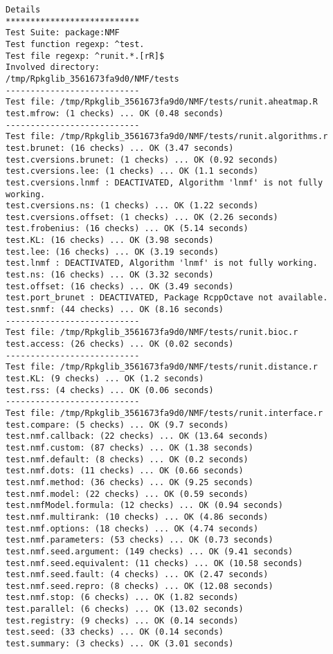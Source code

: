 \documentclass[10pt]{article}\usepackage[]{graphicx}\usepackage[]{color}
\begin{document}
\begin{verbatim}
Details 
*************************** 
Test Suite: package:NMF 
Test function regexp: ^test. 
Test file regexp: ^runit.*.[rR]$ 
Involved directory: 
/tmp/Rpkglib_3561673fa9d0/NMF/tests 
--------------------------- 
Test file: /tmp/Rpkglib_3561673fa9d0/NMF/tests/runit.aheatmap.R 
test.mfrow: (1 checks) ... OK (0.48 seconds)
--------------------------- 
Test file: /tmp/Rpkglib_3561673fa9d0/NMF/tests/runit.algorithms.r 
test.brunet: (16 checks) ... OK (3.47 seconds)
test.cversions.brunet: (1 checks) ... OK (0.92 seconds)
test.cversions.lee: (1 checks) ... OK (1.1 seconds)
test.cversions.lnmf : DEACTIVATED, Algorithm 'lnmf' is not fully working.
test.cversions.ns: (1 checks) ... OK (1.22 seconds)
test.cversions.offset: (1 checks) ... OK (2.26 seconds)
test.frobenius: (16 checks) ... OK (5.14 seconds)
test.KL: (16 checks) ... OK (3.98 seconds)
test.lee: (16 checks) ... OK (3.19 seconds)
test.lnmf : DEACTIVATED, Algorithm 'lnmf' is not fully working.
test.ns: (16 checks) ... OK (3.32 seconds)
test.offset: (16 checks) ... OK (3.49 seconds)
test.port_brunet : DEACTIVATED, Package RcppOctave not available.
test.snmf: (44 checks) ... OK (8.16 seconds)
--------------------------- 
Test file: /tmp/Rpkglib_3561673fa9d0/NMF/tests/runit.bioc.r 
test.access: (26 checks) ... OK (0.02 seconds)
--------------------------- 
Test file: /tmp/Rpkglib_3561673fa9d0/NMF/tests/runit.distance.r 
test.KL: (9 checks) ... OK (1.2 seconds)
test.rss: (4 checks) ... OK (0.06 seconds)
--------------------------- 
Test file: /tmp/Rpkglib_3561673fa9d0/NMF/tests/runit.interface.r 
test.compare: (5 checks) ... OK (9.7 seconds)
test.nmf.callback: (22 checks) ... OK (13.64 seconds)
test.nmf.custom: (87 checks) ... OK (1.38 seconds)
test.nmf.default: (8 checks) ... OK (0.2 seconds)
test.nmf.dots: (11 checks) ... OK (0.66 seconds)
test.nmf.method: (36 checks) ... OK (9.25 seconds)
test.nmf.model: (22 checks) ... OK (0.59 seconds)
test.nmfModel.formula: (12 checks) ... OK (0.94 seconds)
test.nmf.multirank: (10 checks) ... OK (4.86 seconds)
test.nmf.options: (18 checks) ... OK (4.74 seconds)
test.nmf.parameters: (53 checks) ... OK (0.73 seconds)
test.nmf.seed.argument: (149 checks) ... OK (9.41 seconds)
test.nmf.seed.equivalent: (11 checks) ... OK (10.58 seconds)
test.nmf.seed.fault: (4 checks) ... OK (2.47 seconds)
test.nmf.seed.repro: (8 checks) ... OK (12.08 seconds)
test.nmf.stop: (6 checks) ... OK (1.82 seconds)
test.parallel: (6 checks) ... OK (13.02 seconds)
test.registry: (9 checks) ... OK (0.14 seconds)
test.seed: (33 checks) ... OK (0.14 seconds)
test.summary: (3 checks) ... OK (3.01 seconds)

\end{verbatim}
\end{document}
